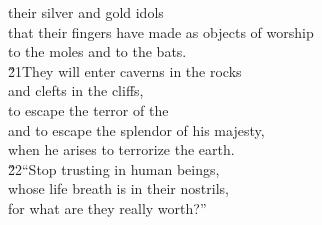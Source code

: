 \begin{poetry}
\poemll    their silver and gold idols \\
\poeml that their fingers have made as objects of worship \\
\poemll    to the moles and to the bats. \\
\poeml \v{21}They will enter caverns in the rocks \\
\poemll    and clefts in the cliffs, \\
\poeml to escape the terror of the  \\
\poemll    and to escape the splendor of his majesty, \\
\poemlll       when he arises to terrorize the earth. \\
\poeml \v{22}``Stop trusting in human beings, \\
\poemll    whose life breath is in their nostrils, \\
\poemlll       for what are they really worth?''
\end{poetry}


